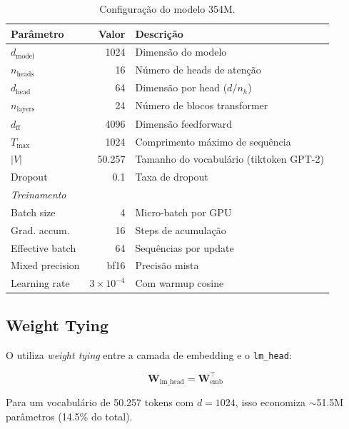 \begin{table}[H]
\centering
\caption{Configura\c{c}\~ao do modelo 354M.}
\label{tab:config_base}
\begin{tabular}{lrl}
\toprule
\textbf{Par\^ametro} & \textbf{Valor} & \textbf{Descri\c{c}\~ao} \\
\midrule
$d_{\text{model}}$ & 1024 & Dimens\~ao do modelo \\
$n_{\text{heads}}$ & 16 & N\'umero de heads de aten\c{c}\~ao \\
$d_{\text{head}}$ & 64 & Dimens\~ao por head ($d/n_h$) \\
$n_{\text{layers}}$ & 24 & N\'umero de blocos transformer \\
$d_{\text{ff}}$ & 4096 & Dimens\~ao feedforward \\
$T_{\max}$ & 1024 & Comprimento m\'aximo de sequ\^encia \\
$|V|$ & 50.257 & Tamanho do vocabul\'ario (tiktoken GPT-2) \\
Dropout & 0.1 & Taxa de dropout \\
\midrule
\multicolumn{3}{l}{\textit{Treinamento}} \\
Batch size & 4 & Micro-batch por GPU \\
Grad. accum. & 16 & Steps de acumula\c{c}\~ao \\
Effective batch & 64 & Sequ\^encias por update \\
Mixed precision & bf16 & Precis\~ao mista \\
Learning rate & $3 \times 10^{-4}$ & Com warmup cosine \\
\bottomrule
\end{tabular}
\end{table}

\subsection{Weight Tying}

O \aletheion{} utiliza \textit{weight tying} entre a camada de embedding e o
\texttt{lm\_head}:

\begin{equation}
    \bm{W}_{\text{lm\_head}} = \bm{W}_{\text{emb}}^\top
\end{equation}

Para um vocabul\'ario de 50.257 tokens com $d = 1024$, isso economiza
$\sim$51.5M par\^ametros (14.5\% do total).
